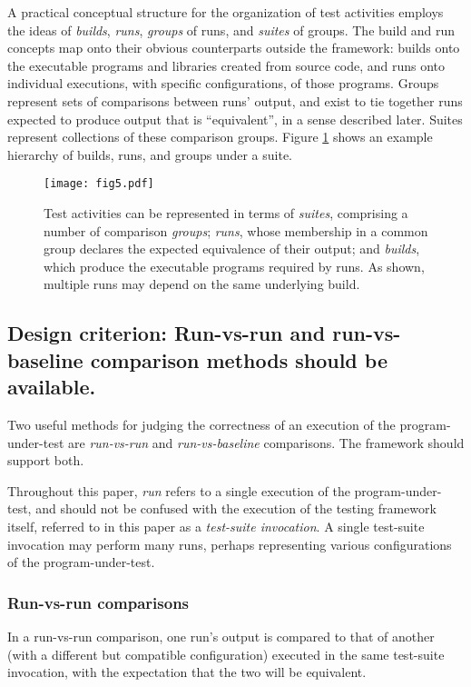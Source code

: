 \documentclass[conference]{IEEEtran}
\begin{document}
A practical conceptual structure for the organization of test activities employs the ideas of \emph{builds}, \emph{runs}, \emph{groups} of runs, and \emph{suites} of groups. The build and run concepts map onto their obvious counterparts outside the framework: builds onto the executable programs and libraries created from source code, and runs onto individual executions, with specific configurations, of those programs. Groups represent sets of comparisons between runs' output, and exist to tie together runs expected to produce output that is ``equivalent'', in a sense described later. Suites represent collections of these comparison groups. Figure \ref{figure:1} shows an example hierarchy of builds, runs, and groups under a suite.

\begin{figure}[!t]
\centering
\texttt{[image: fig5.pdf]}
\caption{Test activities can be represented in terms of \emph{suites}, comprising a number of comparison \emph{groups}; \emph{runs}, whose membership in a common group declares the expected equivalence of their output; and \emph{builds}, which produce the executable programs required by runs. As shown, multiple runs may depend on the same underlying build.}
\label{figure:1}
\end{figure}

\subsection{Design criterion: Run-vs-run and run-vs-baseline comparison methods should be available.}

Two useful methods for judging the correctness of an execution of the program-under-test are \emph{run-vs-run} and \emph{run-vs-baseline} comparisons. The framework should support both.

Throughout this paper, \emph{run} refers to a single execution of the program-under-test, and should not be confused with the execution of the testing framework itself, referred to in this paper as a \emph{test-suite invocation}. A single test-suite invocation may perform many runs, perhaps representing various configurations of the program-under-test.

\subsubsection{Run-vs-run comparisons}

In a run-vs-run comparison, one run's output is compared to that of another (with a different but compatible configuration) executed in the same test-suite invocation, with the expectation that the two will be equivalent.
\end{document}
